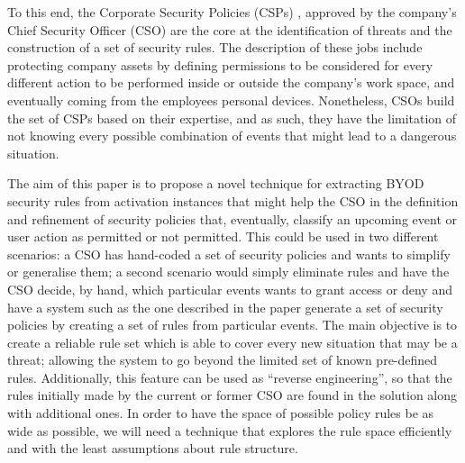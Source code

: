 \documentclass[a4paper,10pt,twocolumn,preprint,3p]{elsarticle}
\begin{document}
To this end, the Corporate Security Policies (CSPs) \cite{Kaeo:2003:DNS:1201807}, 
approved by the company's Chief Security Officer (CSO) are the core at
the  identification of threats and the construction of a set of security rules. The description of these jobs include protecting
company assets by defining permissions to be considered for every
different action to be performed inside or outside the company's work
space, and eventually coming from the employees personal
devices. Nonetheless, CSOs build the set of CSPs based on their
expertise, and as such, they have the limitation of not knowing every
possible combination of events that might lead to a dangerous
situation. 

The aim of this paper is to propose a novel technique for extracting
BYOD security rules from activation instances that might help the CSO in the definition and refinement
of security policies that, eventually, classify an upcoming
event or user action as permitted or not permitted. This could be used
in two different scenarios: a CSO has hand-coded a set of security
policies and wants to simplify or generalise them; a second scenario
would simply eliminate rules and have the CSO decide, by hand, which
particular events wants to grant access or deny and have a system such
as the one described in the paper generate a set of security policies
by creating a set of rules from particular events. 
The main objective is to create a reliable rule set
which is able to cover every new situation that may be a threat;
allowing the system to go beyond the limited set of known pre-defined
rules. Additionally, this feature can be used as ``reverse
engineering'', so that the rules initially made by the current or
former CSO are found in the solution along with additional ones. In
order to have the space of possible policy rules be as wide 
as possible, we will need a technique that explores the rule space
efficiently and with the least assumptions about rule structure.
\end{document}
